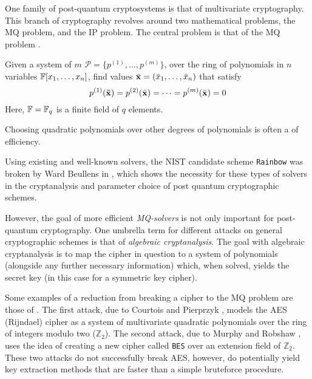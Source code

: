 One family of post-quantum cryptosystems is that of multivariate cryptography. This branch of cryptography revolves around two mathematical problems, the MQ problem, and the IP problem. The central problem is that of the MQ problem \cite{Ding2020}.

\begin{defn}\label{sec1:def:mq}
Given a system of $m$  $\mathcal{P} = \{p^{(1)}, \dots, p^{(m)}\}$, over the ring of polynomials in $n$ variables $\mathbb{F}[x_1, \dots, x_n]$, find values $\Bar{\mathbf{x}} = (\Bar{x}_1, \dots, \Bar{x}_n)$ that satisfy
$$
    p^{(1)}(\mathbf{\Bar{\mathbf{x}}}) =  p^{(2)}(\Bar{\mathbf{x}}) = \dots = p^{(m)}(\Bar{\mathbf{x}}) = 0 
$$
Here, $\mathbb{F} = \mathbb{F}_q$ is a finite field of $q$ elements. 
\end{defn}

Choosing quadratic polynomials over other degrees of polynomials is often a  of efficiency.


 Using existing and well-known solvers, the NIST candidate scheme \texttt{Rainbow} was broken by Ward Beullens in \cite{cryptoeprint:2022/214}, which shows the necessity for these types of solvers in the cryptanalysis and parameter choice of post quantum cryptographic schemes.

However, the goal of more efficient \textit{MQ-solvers} is not only important for post-quantum cryptography. One umbrella term for different attacks on general cryptographic schemes is that of \textit{algebraic cryptanalysis}. The goal with algebraic cryptanalysis is to map the cipher in question to a system of polynomials (alongside any further necessary information) which, when solved, yields the secret key (in this case for a symmetric key cipher).

Some examples of a reduction from breaking a cipher to the MQ problem are those of \cite{nover2005algebraic}. The first attack, due to Courtois and Pierprzyk \cite{courtois2002cryptanalysis}, models the AES (Rijndael) cipher as a system of multivariate quadratic polynomials over the ring of integers modulo two ($\mathbb{Z}_2$). The second attack, due to Murphy and Robshaw \cite{10.1007/3-540-45708-9_1}, uses the idea of creating a new cipher called \texttt{BES} over an extension field of $\mathbb{Z}_2$. These two attacks do not successfully break AES, however, do potentially yield key extraction methods that are faster than a simple bruteforce procedure.

